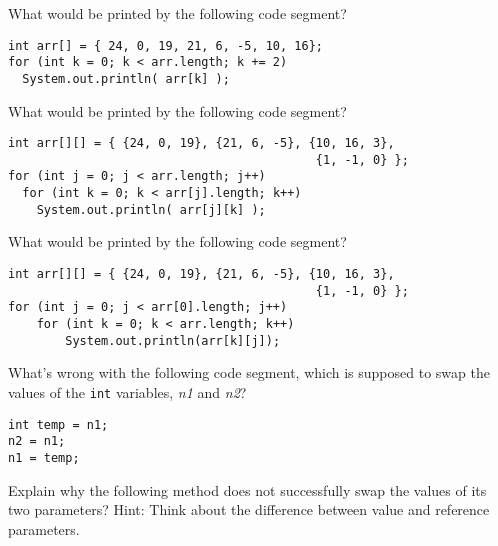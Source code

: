 \begin{EXRtwo}
\item  What would be printed by the following code segment?

\begin{jjjlisting}
\begin{lstlisting}
int arr[] = { 24, 0, 19, 21, 6, -5, 10, 16};
for (int k = 0; k < arr.length; k += 2)
  System.out.println( arr[k] );
\end{lstlisting}
\end{jjjlisting}

\item  What would be printed by the following code segment?

\begin{jjjlisting}
\begin{lstlisting}
int arr[][] = { {24, 0, 19}, {21, 6, -5}, {10, 16, 3}, 
                                           {1, -1, 0} };
for (int j = 0; j < arr.length; j++)
  for (int k = 0; k < arr[j].length; k++)
    System.out.println( arr[j][k] );
\end{lstlisting}
\end{jjjlisting}


\item  What would be printed by the following code segment?

\begin{jjjlisting}
\begin{lstlisting}
int arr[][] = { {24, 0, 19}, {21, 6, -5}, {10, 16, 3}, 
                                           {1, -1, 0} };
for (int j = 0; j < arr[0].length; j++)
    for (int k = 0; k < arr.length; k++)
        System.out.println(arr[k][j]);
\end{lstlisting}
\end{jjjlisting}


\item  What's wrong with the following code segment,
which is supposed to swap the values of the {\tt int}
variables, {\it n1} and {\it n2}?

\begin{jjjlisting}
\begin{lstlisting}
int temp = n1;
n2 = n1;
n1 = temp;
\end{lstlisting}
\end{jjjlisting}

\item  Explain why the following method does
not successfully swap the values of its two parameters?  Hint: Think
about the difference between value and reference parameters.


\end{EXRtwo}
